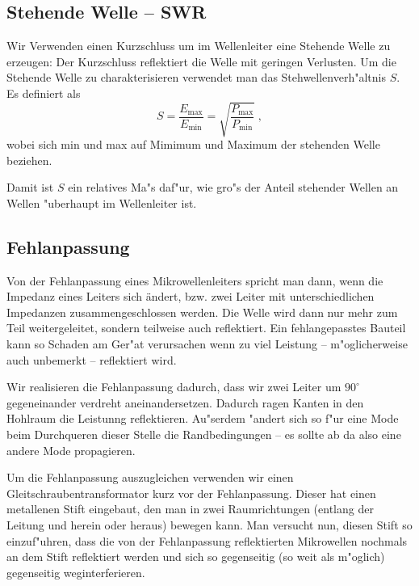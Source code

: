 \documentclass[a4paper,12pt]{article}
\begin{document}
\subsection{Stehende Welle -- SWR}
\label{sec:stehende_welle_swr}


Wir Verwenden einen Kurzschluss um im Wellenleiter eine Stehende Welle
zu erzeugen: Der Kurzschluss reflektiert die Welle mit geringen
Verlusten. Um die Stehende Welle zu charakterisieren verwendet man das
Stehwellenverh"altnis $S$. Es definiert als
\begin{equation}
  \label{eq:24}
  S = \frac{ E_\text{max} }{ E_\text{min} } = \sqrt{  \frac{
      P_\text{max} }{ P_\text{min} }  } \;,
\end{equation}
wobei sich min und max auf Mimimum und Maximum der stehenden Welle
beziehen.

Damit ist $S$ ein relatives Ma"s daf"ur, wie gro"s der Anteil
stehender Wellen an Wellen "uberhaupt im Wellenleiter ist.


\subsection{Fehlanpassung}

Von der Fehlanpassung eines Mikrowellenleiters spricht man dann, wenn
die Impedanz eines Leiters sich ändert, bzw. zwei Leiter mit
unterschiedlichen Impedanzen zusammengeschlossen werden. Die Welle
wird dann nur mehr zum Teil weitergeleitet, sondern teilweise auch
reflektiert. Ein fehlangepasstes Bauteil kann so Schaden am Ger"at
verursachen wenn zu viel Leistung -- m"oglicherweise auch unbemerkt --
reflektiert wird.

Wir realisieren die Fehlanpassung dadurch, dass wir zwei Leiter um
$90^\circ$ gegeneinander verdreht aneinandersetzen. Dadurch ragen
Kanten in den Hohlraum die Leistunng reflektieren. Au"serdem "andert
sich so f"ur eine Mode beim Durchqueren dieser Stelle die
Randbedingungen -- es sollte ab da also eine andere Mode propagieren.

Um die Fehlanpassung auszugleichen verwenden wir einen
Gleitschraubentransformator kurz vor der Fehlanpassung. Dieser hat
einen metallenen Stift eingebaut, den man in zwei Raumrichtungen
(entlang der Leitung und herein oder heraus) bewegen kann. Man
versucht nun, diesen Stift so einzuf"uhren, dass die von der
Fehlanpassung reflektierten Mikrowellen nochmals an dem Stift
reflektiert werden und sich so gegenseitig (so weit als m"oglich)
gegenseitig weginterferieren.
\end{document}

